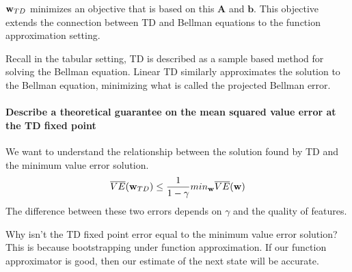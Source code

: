 \documentclass[sutton_barto_notes.tex]{subfiles}
\begin{document}
${\operatorname*{\mathbf{w}}}_{TD}$ minimizes an objective that is based on this $\bm{A}$ and $\bm{b}$. This objective extends the connection between TD and Bellman equations to the function approximation setting.

Recall in the tabular setting, TD is described as a sample based method for solving the Bellman equation. Linear TD similarly approximates the solution to the Bellman equation, minimizing what is called the projected Bellman error.

\paragraph{Describe a theoretical guarantee on the mean squared value error at the TD fixed point}

We want to understand the relationship between the solution found by TD and the minimum value error solution.
$$\overline{VE}({\operatorname*{\mathbf{w}}}_{TD}) \leq \frac{1}{1-\gamma}min_{{\operatorname*{\mathbf{w}}}}\overline{VE}({\operatorname*{\mathbf{w}}})$$
The difference between these two errors depends on $\gamma$ and the quality of features.

Why isn't the TD fixed point error equal to the minimum value error solution? This is because bootstrapping under function approximation. If our function approximator is good, then our estimate of the next state will be accurate.
\end{document}
